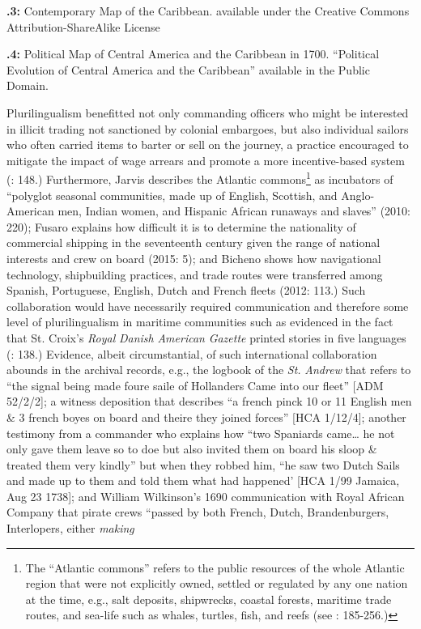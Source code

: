 {\textbf{.3:}}{  Contemporary} Map of the Caribbean. \citet{Kmusser2011} available under the Creative Commons Attribution-ShareAlike License

 
\bfseries

 

{\textbf{.4:}}{} Political Map of Central America and the Caribbean in 1700. \citet{Esemono2009} “Political Evolution of Central America and the Caribbean” available in the Public Domain.

Plurilingualism benefitted not only commanding officers who might be interested in illicit trading not sanctioned by colonial embargoes, but also individual sailors who often carried items to barter or sell on the journey, a practice encouraged to mitigate the impact of wage arrears and promote a more incentive-based system (\citealt{Jarvis2010}: 148.) Furthermore, Jarvis describes the Atlantic commons\footnote{The “Atlantic commons” refers to the public resources of the whole Atlantic region that were not explicitly owned, settled or regulated by any one nation at the time, e.g., salt deposits, shipwrecks, coastal forests, maritime trade routes, and sea-life such as whales, turtles, fish, and reefs (see \citealt{Jarvis2010}: 185-256.)} as incubators of “polyglot seasonal communities, made up of English, Scottish, and Anglo-American men, Indian women, and Hispanic African runaways and slaves” (2010: 220); Fusaro explains how difficult it is to determine the nationality of commercial shipping in the seventeenth century given the range of national interests and crew on board (2015: 5); and Bicheno shows how navigational technology, shipbuilding practices, and trade routes were transferred among Spanish, Portuguese, English, Dutch and French fleets (2012: 113.) Such collaboration would have necessarily required communication and therefore some level of plurilingualism in maritime communities such as evidenced in the fact that St. Croix’s \textit{Royal} \textit{Danish} \textit{American} \textit{Gazette} printed stories in five languages (\citealt{Jarvis2010}: 138.) Evidence, albeit circumstantial, of such international collaboration abounds in the archival records, e.g., the logbook of the \textit{St.} \textit{Andrew} that refers to “the signal being made foure saile of Hollanders Came into our fleet” [ADM 52/2/2]; a witness deposition that describes “a french pinck 10 or 11 English men \& 3 french boyes on board and theire they joined forces” [HCA 1/12/4]; another testimony from a commander who explains how “two Spaniards came… he not only gave them leave so to doe but also invited them on board his sloop \& treated them very kindly” but when they robbed him, “he saw two Dutch Sails and made up to them and told them what had happened’ [HCA 1/99 Jamaica, Aug 23 1738]; and William Wilkinson’s 1690 communication with Royal African Company that pirate crews “passed by both French, Dutch, Brandenburgers, Interlopers, either \textit{making} 